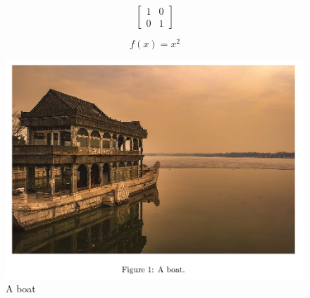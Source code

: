 \documentclass{article}
\begin{document}
\begin{equation*}
  \left[
  \begin{matrix}
  1 & 0\\
  0 & 1
  \end{matrix}
  \right]
\end{equation*}

\begin{equation}
  f(x) = x^2
\end{equation}

\begin{figure}[h!]
  \includegraphics[width=\linewidth]{boat.png}
  \caption{A boat}
  \label{figure:boat1}
\end{figure}
\end{document}

